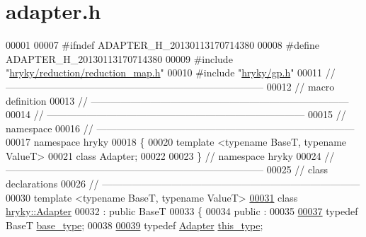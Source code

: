 \hypertarget{adapter_8h_source}{\section{adapter.\-h}
}

\begin{DoxyCode}
00001 
00007 \textcolor{preprocessor}{#ifndef ADAPTER\_H\_20130113170714380}
00008 \textcolor{preprocessor}{}\textcolor{preprocessor}{#define ADAPTER\_H\_20130113170714380}
00009 \textcolor{preprocessor}{}\textcolor{preprocessor}{#include "\hyperlink{reduction__map_8h}{hryky/reduction/reduction_map.h}"}
00010 \textcolor{preprocessor}{#include "\hyperlink{gp_8h}{hryky/gp.h}"}
00011 \textcolor{comment}{//
      ------------------------------------------------------------------------------}
00012 \textcolor{comment}{// macro definition}
00013 \textcolor{comment}{//
      ------------------------------------------------------------------------------}
00014 \textcolor{comment}{//
      ------------------------------------------------------------------------------}
00015 \textcolor{comment}{// namespace}
00016 \textcolor{comment}{//
      ------------------------------------------------------------------------------}
00017 \textcolor{keyword}{namespace }hryky
00018 \{
00020     \textcolor{keyword}{template} <\textcolor{keyword}{typename} BaseT, \textcolor{keyword}{typename} ValueT>
00021     \textcolor{keyword}{class }Adapter;
00022 
00023 \} \textcolor{comment}{// namespace hryky}
00024 \textcolor{comment}{//
      ------------------------------------------------------------------------------}
00025 \textcolor{comment}{// class declarations}
00026 \textcolor{comment}{//
      ------------------------------------------------------------------------------}
00030 \textcolor{comment}{}\textcolor{keyword}{template} <\textcolor{keyword}{typename} BaseT, \textcolor{keyword}{typename} ValueT>
\hypertarget{adapter_8h_source_l00031}{}\hyperlink{classhryky_1_1_adapter}{00031} \textcolor{keyword}{class }\hyperlink{classhryky_1_1_adapter}{hryky::Adapter}
00032     : \textcolor{keyword}{public} BaseT
00033 \{
00034 \textcolor{keyword}{public} :
00035 
\hypertarget{adapter_8h_source_l00037}{}\hyperlink{classhryky_1_1_adapter_a577d587d418b924d5d57f80b21d3e3cb}{00037}     \textcolor{keyword}{typedef} BaseT \hyperlink{classhryky_1_1_adapter_a577d587d418b924d5d57f80b21d3e3cb}{base_type};
00038 
\hypertarget{adapter_8h_source_l00039}{}\hyperlink{classhryky_1_1_adapter_a30de4db4c91a113187fa2f0edbcb1b2a}{00039}     \textcolor{keyword}{typedef} \hyperlink{classhryky_1_1_adapter}{Adapter} \hyperlink{classhryky_1_1_adapter_a30de4db4c91a113187fa2f0edbcb1b2a}{this_type};

\end{DoxyCode}
